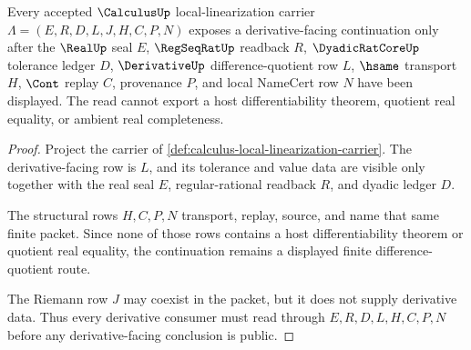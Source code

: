 \begin{theorem}
\label{thm:calculus-derivative-continuation-obligation}
Every accepted $\CalculusUp$ local-linearization carrier
$\Lambda=(E,R,D,L,J,H,C,P,N)$ exposes a derivative-facing continuation only
after the $\RealUp$ seal $E$, $\RegSeqRatUp$ readback $R$,
$\DyadicRatCoreUp$ tolerance ledger $D$, $\DerivativeUp$ difference-quotient
row $L$, $\hsame$ transport $H$, $\Cont$ replay $C$, provenance $P$, and local
NameCert row $N$ have been displayed. The read cannot export a host
differentiability theorem, quotient real equality, or ambient real
completeness.
\end{theorem}
\begin{proof}
Project the carrier of
\autoref{def:calculus-local-linearization-carrier}. The derivative-facing row
is $L$, and its tolerance and value data are visible only together with the
real seal $E$, regular-rational readback $R$, and dyadic ledger $D$.

The structural rows $H,C,P,N$ transport, replay, source, and name that same
finite packet. Since none of those rows contains a host differentiability
theorem or quotient real equality, the continuation remains a displayed
finite difference-quotient route.

The Riemann row $J$ may coexist in the packet, but it does not supply
derivative data. Thus every derivative consumer must read through
$E,R,D,L,H,C,P,N$ before any derivative-facing conclusion is public.
\end{proof}

